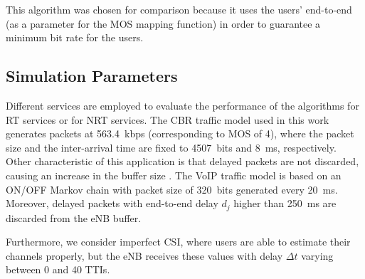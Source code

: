 \documentclass[conference]{IEEEtran}
\begin{document}
This algorithm was chosen for comparison because it uses the users' end-to-end (as a parameter for the MOS mapping function) in order to guarantee a minimum bit rate for the users.

\subsection{Simulation Parameters}
\label{Sec:SimulParams}
%
Different services are employed to evaluate the performance of the algorithms for RT services or for NRT services. The \ac{CBR} traffic model used in this work generates packets at 563.4~kbps (corresponding to MOS of 4), where the packet size and the inter-arrival time are fixed to 4507~bits and 8~ms, respectively. Other characteristic of this application is that delayed packets are not discarded, causing an  increase in the buffer size \cite{Nasralla2013}. The \ac{VoIP} traffic model is based on an ON/OFF Markov chain with packet size of 320~bits generated every 20~ms. Moreover, delayed packets with end-to-end delay $d_j$ higher than 250~ms are discarded from the \ac{eNB} buffer. 

Furthermore, we consider imperfect \ac{CSI}, where users are able to estimate their channels properly, but the \ac{eNB} receives these values with delay $\Delta t$ varying between 0 and 40 TTIs.	  
\end{document}
